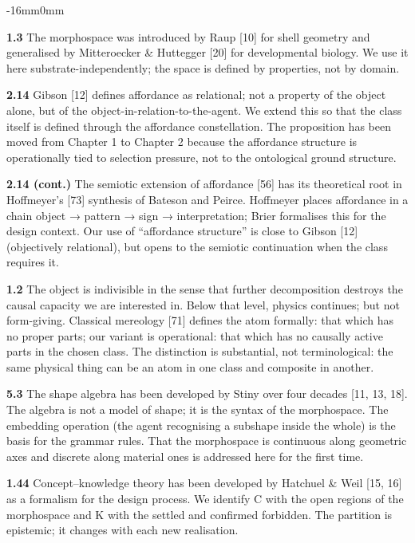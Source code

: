 \documentclass[10pt,oneside]{book}
\newenvironment{widebody}{%
  \begin{adjustwidth}{-16mm}{0mm}%
}{%
  \end{adjustwidth}%
}
\begin{document}
\par\addvspace{14pt}
\begin{widebody}
{\footnotesize

\textbf{1.3} The morphospace was introduced by Raup [10] for shell geometry and generalised by Mitteroecker \& Huttegger [20] for developmental biology. We use it here substrate-independently; the space is defined by properties, not by domain.

\textbf{2.14} Gibson [12] defines affordance as relational; not a property of the object alone, but of the object-in-relation-to-the-agent. We extend this so that the class itself is defined through the affordance constellation. The proposition has been moved from Chapter 1 to Chapter 2 because the affordance structure is operationally tied to selection pressure, not to the ontological ground structure.

\textbf{2.14 (cont.)} The semiotic extension of affordance [56] has its theoretical root in Hoffmeyer's [73] synthesis of Bateson and Peirce. Hoffmeyer places affordance in a chain object → pattern → sign → interpretation; Brier formalises this for the design context. Our use of ``affordance structure'' is close to Gibson [12] (objectively relational), but opens to the semiotic continuation when the class requires it.

\textbf{1.2} The object is indivisible in the sense that further decomposition destroys the causal capacity we are interested in. Below that level, physics continues; but not form-giving. Classical mereology [71] defines the atom formally: that which has no proper parts; our variant is operational: that which has no causally active parts in the chosen class. The distinction is substantial, not terminological: the same physical thing can be an atom in one class and composite in another.

\textbf{5.3} The shape algebra has been developed by Stiny over four decades [11, 13, 18]. The algebra is not a model of shape; it is the syntax of the morphospace. The embedding operation (the agent recognising a subshape inside the whole) is the basis for the grammar rules. That the morphospace is continuous along geometric axes and discrete along material ones is addressed here for the first time.

\textbf{1.44} Concept--knowledge theory has been developed by Hatchuel \& Weil [15, 16] as a formalism for the design process. We identify C with the open regions of the morphospace and K with the settled and confirmed forbidden. The partition is epistemic; it changes with each new realisation.

}
\end{widebody}
\end{document}
